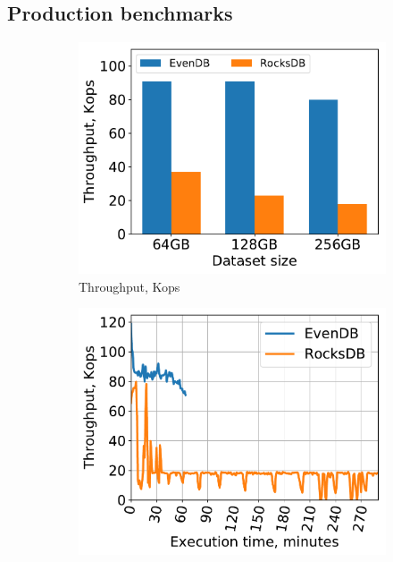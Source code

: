 
\subsection{Production benchmarks}
\label{ssec:prod}

\begin{figure}[tb]
\centering
\begin{subfigure}{0.3\linewidth}
\includegraphics[width=\textwidth]{figs/ingestion.pdf}
\caption{Throughput, Kops}
\label{fig:prod:ingestion:a}
\end{subfigure}
\hspace{0.01\linewidth} 
\begin{subfigure}{0.3\linewidth}
\includegraphics[width=\textwidth]{figs/throughput_256_ingestions_line.pdf}

\end{subfigure}
\end{figure}
